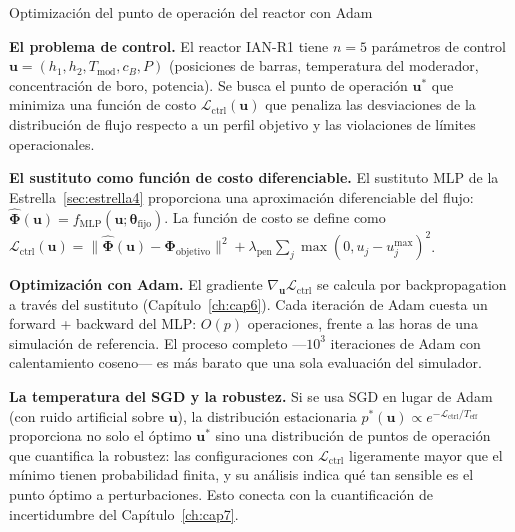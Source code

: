 \begin{estrella}{Optimización del punto de operación del reactor con Adam}
\label{sec:estrella5}

\textbf{El problema de control.}
El reactor IAN-R1 tiene $n = 5$ parámetros de control
$\bm{u} = (h_1, h_2, T_{\text{mod}}, c_B, P)$ (posiciones de barras,
temperatura del moderador, concentración de boro, potencia). Se busca
el punto de operación $\bm{u}^*$ que minimiza una función de costo
$\mathcal{L}_{\text{ctrl}}(\bm{u})$ que penaliza las desviaciones de la
distribución de flujo respecto a un perfil objetivo y las violaciones de
límites operacionales.

\textbf{El sustituto como función de costo diferenciable.}
El sustituto MLP de la Estrella~\ref{sec:estrella4} proporciona una
aproximación diferenciable del flujo:
$\hat{\bm{\Phi}}(\bm{u}) = f_{\text{MLP}}(\bm{u};\bm{\theta}_{\text{fijo}})$.
La función de costo se define como
$\mathcal{L}_{\text{ctrl}}(\bm{u}) =
\|\hat{\bm{\Phi}}(\bm{u}) - \bm{\Phi}_{\text{objetivo}}\|^2 +
\lambda_{\text{pen}}\sum_j\max(0, u_j - u_j^{\max})^2$.

\textbf{Optimización con Adam.}
El gradiente $\nabla_{\bm{u}}\mathcal{L}_{\text{ctrl}}$ se calcula por
backpropagation a través del sustituto (Capítulo~\ref{ch:cap6}). Cada
iteración de Adam cuesta un forward + backward del MLP: $O(p)$
operaciones, frente a las horas de una simulación de referencia. El
proceso completo —$10^3$ iteraciones de Adam con calentamiento coseno—
es más barato que una sola evaluación del simulador.

\textbf{La temperatura del SGD y la robustez.}
Si se usa SGD en lugar de Adam (con ruido artificial sobre
$\bm{u}$), la distribución estacionaria
$p^*(\bm{u}) \propto e^{-\mathcal{L}_{\text{ctrl}}/T_{\text{eff}}}$
proporciona no solo el óptimo $\bm{u}^*$ sino una distribución de
puntos de operación que cuantifica la robustez: las configuraciones
con $\mathcal{L}_{\text{ctrl}}$ ligeramente mayor que el mínimo tienen
probabilidad finita, y su análisis indica qué tan sensible es el
punto óptimo a perturbaciones. Esto conecta con la cuantificación de
incertidumbre del Capítulo~\ref{ch:cap7}.
\end{estrella}

\printbibliography[heading=subbibliography]